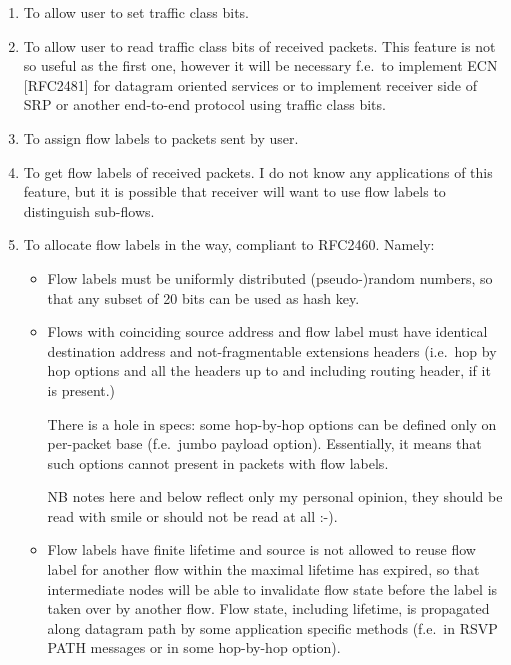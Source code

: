 \begin{enumerate}

\item To allow user to set traffic class bits.

\item To allow user to read traffic class bits of received packets.
This feature is not so useful as the first one, however it will be
necessary f.e.\ to implement ECN [RFC2481] for datagram oriented services
or to implement receiver side of SRP or another end-to-end protocol
using traffic class bits.

\item To assign flow labels to packets sent by user.

\item To get flow labels of received packets. I do not know
any applications of this feature, but it is possible that receiver will
want to use flow labels to distinguish sub-flows.

\item To allocate flow labels in the way, compliant to RFC2460. Namely:

\begin{itemize}
\item
Flow labels must be uniformly distributed (pseudo-)random numbers,
so that any subset of 20 bits can be used as hash key.

\item
Flows with coinciding source address and flow label must have identical
destination address and not-fragmentable extensions headers (i.e.\
hop by hop options and all the headers up to and including routing header,
if it is present.)

\begin{NB}
There is a hole in specs: some hop-by-hop options can be
defined only on per-packet base (f.e.\  jumbo payload option).
Essentially, it means that such options cannot present in packets
with flow labels.
\end{NB}
\begin{NB}
NB notes here and below reflect only my personal opinion,
they should be read with smile or should not be read at all :-).
\end{NB}


\item
Flow labels have finite lifetime and source is not allowed to reuse
flow label for another flow within the maximal lifetime has expired,
so that intermediate nodes will be able to invalidate flow state before
the label is taken over by another flow.
Flow state, including lifetime, is propagated along datagram path
by some application specific methods
(f.e.\ in RSVP PATH messages or in some hop-by-hop option).


\end{itemize}

\end{enumerate}

